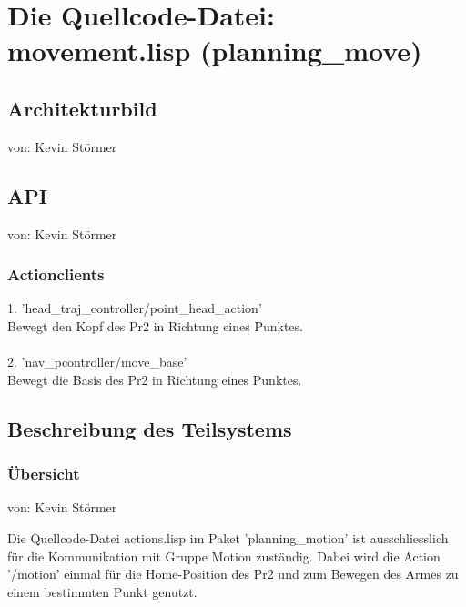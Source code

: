 \documentclass{suturo}
\makeatletter
\newcommand{\chapterauthor}[1]{%
  {\parindent0pt\vspace*{-27pt}%
  \linespread{0}\small\begin{flushright}von: #1\end{flushright}%
  \par\nobreak\vspace*{0pt}}
  \@afterheading%
}
\makeatother
\begin{document}
\newpage
\section{Die Quellcode-Datei: movement.lisp (planning\_move)}
\subsection{Architekturbild}
\chapterauthor{Kevin Störmer}


\begin{figure}[!htb]
\end{figure}


\subsection{API}
\chapterauthor{Kevin Störmer}
\subsubsection{Actionclients}
1. 'head\_traj\_controller/point\_head\_action' \\
Bewegt den Kopf des Pr2 in Richtung eines Punktes.\\ \\
2. 'nav\_pcontroller/move\_base' \\
Bewegt die Basis des Pr2 in Richtung eines Punktes.
\subsection{Beschreibung des Teilsystems}

\subsubsection{\"Ubersicht}
\chapterauthor{Kevin Störmer}
Die Quellcode-Datei actions.lisp im Paket 'planning\_motion'  ist ausschliesslich für die Kommunikation mit Gruppe Motion zuständig. Dabei wird die Action '/motion' einmal für die Home-Position des Pr2 und zum Bewegen des Armes zu einem bestimmten Punkt genutzt.
\end{document}
